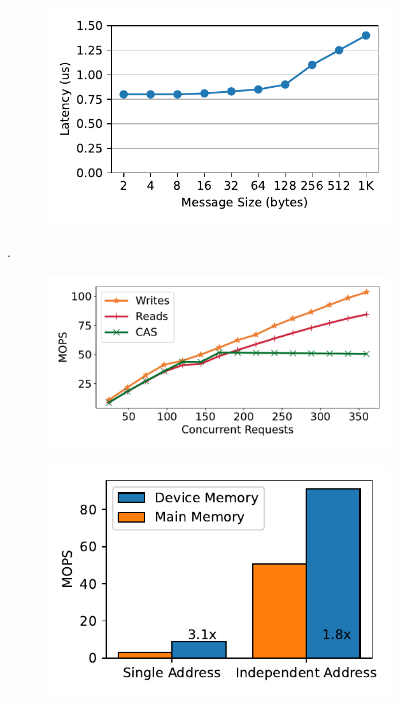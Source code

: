 \begin{figure}[t]
    \centering
    \begin{subfigure}{0.3\linewidth}
        \includegraphics[width=0.99\linewidth]{fig/rdma_latency.pdf}
        \label{fig:rdma_latency}
    \end{subfigure}.
    \begin{subfigure}{0.3\linewidth}
        \includegraphics[width=0.99\linewidth]{fig/rdma_concur.pdf}
    \end{subfigure}
    \begin{subfigure}{0.3\linewidth}
        \includegraphics[width=0.99\linewidth]{fig/rdma_cas_throughput.pdf}

\end{subfigure}
\end{figure}
